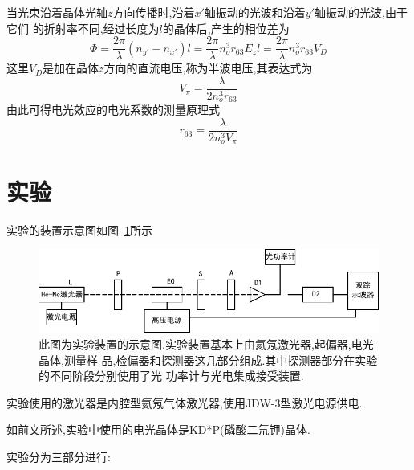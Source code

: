 \documentclass[aps,pre,12pt,preprint,onecolumn,showpacs,showkeys]{revtex4-1}
\begin{document}
当光束沿着晶体光轴$z$方向传播时,沿着$x'$轴振动的光波和沿着$y'$轴振动的光波,由于它们
的折射率不同,经过长度为$l$的晶体后,产生的相位差为
\begin{equation}
    \Phi = \frac{2\pi}{\lambda}(n_{y'} - n_{x'})l =
    \frac{2\pi}{\lambda}n_o^3r_{63}E_zl = \frac{2\pi}{\lambda}n_o^3r_{63}V_D
\end{equation}
这里$V_D$是加在晶体$z$方向的直流电压,称为半波电压,其表达式为
\begin{equation}
    V_{\pi} = \frac{\lambda}{2n_o^3r_{63}}
\end{equation}
由此可得电光效应的电光系数的测量原理式
\begin{equation}
    r_{63} = \frac{\lambda}{2n_o^3V_{\pi}}
\end{equation}\cite{Book}

\section{实验}

实验的装置示意图如图~\ref{fig:ins}所示

\begin{figure}[htbp]
    \centering
    \includegraphics[width=\textwidth]{drawing.pdf}
    \caption{\label{fig:ins}%
        此图为实验装置的示意图.实验装置基本上由氦氖激光器,起偏器,电光晶体,测量样
        品,检偏器和探测器这几部分组成.其中探测器部分在实验的不同阶段分别使用了光
        功率计与光电集成接受装置.}
\end{figure}

实验使用的激光器是内腔型氦氖气体激光器,使用JDW-3型激光电源供电.

如前文所述,实验中使用的电光晶体是KD*P(磷酸二氘钾)晶体.\cite{Book}

实验分为三部分进行:
\end{document}
